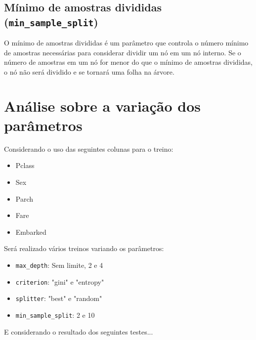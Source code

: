 \documentclass[a4paper,11pt]{article}
\begin{document}
\subsection{Mínimo de amostras divididas (\texttt{min\_sample\_split})}
O mínimo de amostras divididas é um parâmetro que controla o número mínimo de amostras necessárias para considerar dividir um nó em um nó interno. Se o número de amostras em um nó for menor do que o mínimo de amostras divididas, o nó não será dividido e se tornará uma folha na árvore.

\pagebreak

\section{Análise sobre a variação dos parâmetros}

Considerando o uso das seguintes colunas para o treino:
\begin{itemize}[label=--]
    \item Pclass
    \item Sex
    \item Parch
    \item Fare
    \item Embarked
\end{itemize}

Será realizado vários treinos variando os parâmetros:

\begin{itemize}[label=--]
    \item \texttt{max\_depth}: Sem limite, 2 e 4
    \item \texttt{criterion}: "gini" e "entropy"
    \item \texttt{splitter}: "best" e "random"
    \item \texttt{min\_sample\_split}: 2 e 10
\end{itemize}

E considerando o resultado dos seguintes testes...
\end{document}
